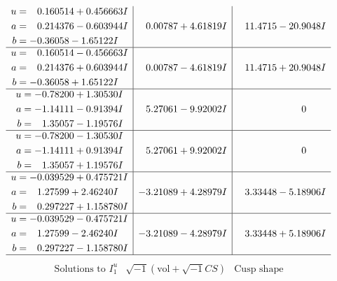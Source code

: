 \documentclass[1p]{elsarticle_modified}
\theoremstyle{definition}
\newcommand{\I}{\sqrt{-1}}
\begin{document}
$$\begin{array}{c|c|c}
\begin{aligned}
u &= \phantom{-}0.160514 + 0.456663 I \\
a &= \phantom{-}0.214376 - 0.603944 I \\
b &= -0.36058 - 1.65122 I\end{aligned}
 & \phantom{-}0.00787 + 4.61819 I & \phantom{-}11.4715 - 20.9048 I \\ \hline\begin{aligned}
u &= \phantom{-}0.160514 - 0.456663 I \\
a &= \phantom{-}0.214376 + 0.603944 I \\
b &= -0.36058 + 1.65122 I\end{aligned}
 & \phantom{-}0.00787 - 4.61819 I & \phantom{-}11.4715 + 20.9048 I \\ \hline\begin{aligned}
u &= -0.78200 + 1.30530 I \\
a &= -1.14111 - 0.91394 I \\
b &= \phantom{-}1.35057 - 1.19576 I\end{aligned}
 & \phantom{-}5.27061 - 9.92002 I & \phantom{-0.000000 } 0 \\ \hline\begin{aligned}
u &= -0.78200 - 1.30530 I \\
a &= -1.14111 + 0.91394 I \\
b &= \phantom{-}1.35057 + 1.19576 I\end{aligned}
 & \phantom{-}5.27061 + 9.92002 I & \phantom{-0.000000 } 0 \\ \hline\begin{aligned}
u &= -0.039529 + 0.475721 I \\
a &= \phantom{-}1.27599 + 2.46240 I \\
b &= \phantom{-}0.297227 + 1.158780 I\end{aligned}
 & -3.21089 + 4.28979 I & \phantom{-}3.33448 - 5.18906 I \\ \hline\begin{aligned}
u &= -0.039529 - 0.475721 I \\
a &= \phantom{-}1.27599 - 2.46240 I \\
b &= \phantom{-}0.297227 - 1.158780 I\end{aligned}
 & -3.21089 - 4.28979 I & \phantom{-}3.33448 + 5.18906 I\\
 \hline 
 \end{array}$$\newpage$$\begin{array}{c|c|c}  
\text{Solutions to }I^u_{1}& \I (\text{vol} + \sqrt{-1}CS) & \text{Cusp shape}\\

\end{array}$$
\end{document}
